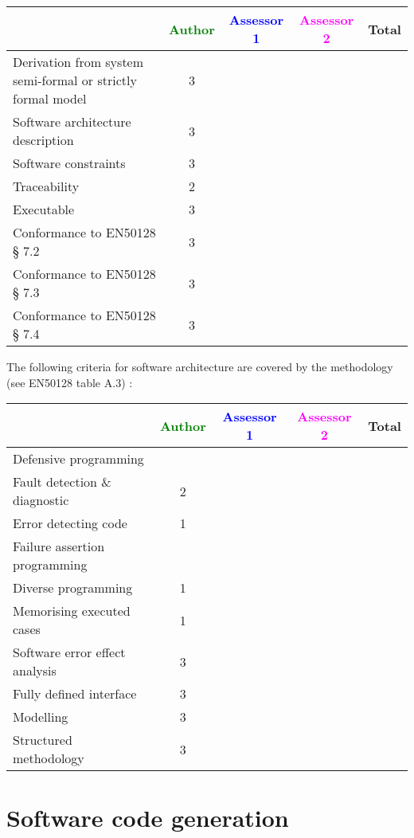 \begin{tabular}{|l | c | c | c | c|}
\hline
& \textcolor{green}{Author} & \textcolor{blue}{Assessor 1} & \textcolor{magenta}{Assessor 2} & Total \\
\hline
Derivation from system semi-formal or strictly formal model  & 3 & & &  \\
\hline 
Software architecture description  & 3 & & &  \\
\hline
Software constraints  & 3 & & &  \\
\hline
Traceability  & 2 & & &  \\
\hline
Executable  & 3 & & &  \\
\hline
Conformance to EN50128 § 7.2  & 3 & & &  \\
\hline
Conformance to EN50128 § 7.3  & 3 & & &  \\
\hline
Conformance to EN50128 § 7.4  & 3 & & &  \\
\hline
\end{tabular}

The following criteria for software architecture are covered by the methodology
(see EN50128 table A.3) :

\begin{tabular}{|l | c | c | c | c|}
\hline
& \textcolor{green}{Author} & \textcolor{blue}{Assessor 1} & \textcolor{magenta}{Assessor 2} & Total \\
\hline
Defensive programming  & & & &  \\
\hline 
Fault detection \& diagnostic  & 2 & & &  \\
\hline
Error detecting code  & 1 & & &  \\
\hline
Failure assertion programming & & & &  \\
\hline
Diverse programming & 1 & & &  \\
\hline
Memorising executed cases & 1 & & &  \\
\hline
Software error effect analysis & 3 & & &  \\
\hline
Fully defined interface & 3 & & &  \\
\hline
Modelling  & 3 & & &  \\
\hline
Structured methodology & 3 & & &  \\
\hline
\end{tabular}

\section{Software code generation}

